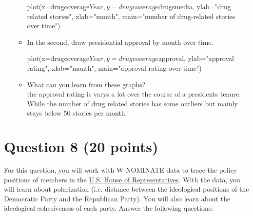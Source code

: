 \documentclass[12pt,letterpaper]{article}
\begin{document}
\begin{itemize}
\begin{itemize}
plot(x=drugcoverage$Year, y=drugcoverage$drugsmedia, ylab="drug related stories", xlab="month", main="number of drug-related stories over time")

\item In the second, draw presidential approval by month over time.

plot(x=drugcoverage$Year, y=drugcoverage$approval, ylab="approval rating", xlab="month", main="approval rating over time")

\item What can you learn from these graphs? \\
the approval rating is varys a lot over the course of a presidents tenure. While the number of drug related stories has some outliers but mainly stays below 50 stories per month.

\end{itemize}



\end{itemize}

\section*{Question 8 (20 points)}
For this question, you will work with W-NOMINATE data to trace the policy positions of members in the \href{https://drive.google.com/open?id=1kVn-Asz8KXPQhiLSQGEabdVJh9_8_wjf}{U.S. House of Representatives}. With the data, you will learn about polarization (i.e. distance between the ideological positions of the Democratic Party and the Republican Party). You will also learn about the ideological cohesiveness of each party. Answer the following questions:\\
\end{document}
